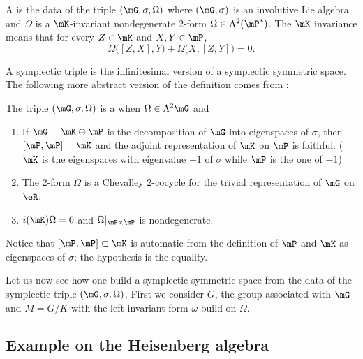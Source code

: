 A  is the data of the triple $(\mG,\sigma,\Omega)$ where $(\mG,\sigma)$ is an involutive Lie algebra and $\Omega$ is a $\mK$-invariant nondegenerate $2$-form $\Omega\in\Lambda^2(\mP^*)$. The $\mK$ invariance means that for every $Z\in\mK$ and $X,Y\in\mP$,
\begin{equation}
	\Omega\big( [Z,X],Y \big)+\Omega\big( X,[Z,Y] \big)=0.
\end{equation}

A symplectic triple is the infinitesimal version of a symplectic symmetric space. The following more abstract version of the definition comes from \cite{StrictSolvableSym}:
\begin{definition}
	The triple $(\mG,\sigma,\Omega)$ is a  when $\Omega\in\Lambda^2\mG$ and
	\begin{enumerate}
		\item  If  $\mG=\mK\oplus\mP$ is the decomposition of $\mG$ into eigenspaces of $\sigma$,  then $[\mP,\mP]=\mK$ and the adjoint representation of $\mK$ on $\mP$ is faithful. ($\mK$ is the eigenspaces with eigenvalue $+1$ of $\sigma$ while $\mP$ is the one of $-1$)

		\item The $2$-form $\Omega$ is a Chevalley $2$-cocycle for the trivial representation of $\mG$ on $\eR$.

		\item $i(\mK)\Omega=0$ and $\Omega|_{\mP\times\mP}$ is nondegenerate.
	\end{enumerate}
\end{definition}

Notice that $[\mP,\mP]\subset\mK$ is automatic from the definition of $\mP$ and $\mK$ as eigenspaces of $\sigma$; the hypothesis is the equality.

Let us now see how one build a symplectic symmetric space from the data of the symplectic triple $(\mG,\sigma,\Omega)$. First we consider $G$, the group associated with $\mG$ and $M=G/K$ with the left invariant form $\omega$ build on $\Omega$.

\subsection{Example on the Heisenberg algebra}

